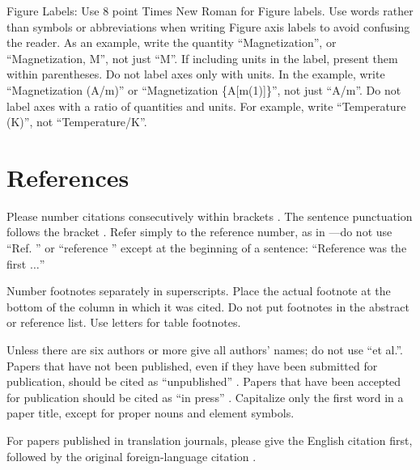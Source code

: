 \documentclass[conference, 10pt]{IEEEtran}
\begin{document}
Figure Labels: Use 8 point Times New Roman for Figure labels. Use words 
rather than symbols or abbreviations when writing Figure axis labels to 
avoid confusing the reader. As an example, write the quantity 
``Magnetization'', or ``Magnetization, M'', not just ``M''. If including 
units in the label, present them within parentheses. Do not label axes only 
with units. In the example, write ``Magnetization (A/m)'' or ``Magnetization 
\{A[m(1)]\}'', not just ``A/m''. Do not label axes with a ratio of 
quantities and units. For example, write ``Temperature (K)'', not 
``Temperature/K''.



\section*{References}

Please number citations consecutively within brackets \cite{b1}. The 
sentence punctuation follows the bracket \cite{b2}. Refer simply to the reference 
number, as in \cite{b3}---do not use ``Ref. \cite{b3}'' or ``reference \cite{b3}'' except at 
the beginning of a sentence: ``Reference \cite{b3} was the first $\ldots$''

Number footnotes separately in superscripts. Place the actual footnote at 
the bottom of the column in which it was cited. Do not put footnotes in the 
abstract or reference list. Use letters for table footnotes.

Unless there are six authors or more give all authors' names; do not use 
``et al.''. Papers that have not been published, even if they have been 
submitted for publication, should be cited as ``unpublished'' \cite{b4}. Papers 
that have been accepted for publication should be cited as ``in press'' \cite{b5}. 
Capitalize only the first word in a paper title, except for proper nouns and 
element symbols.

For papers published in translation journals, please give the English 
citation first, followed by the original foreign-language citation \cite{b6}.
\end{document}
